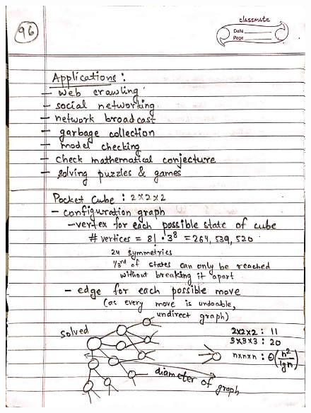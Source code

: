 \begin{figure}[H]
    \centering
    \includegraphics[width=16cm, height=21cm]{"./MIT-6.006/MIT-6006-096"}
\end{figure}
\newpage
